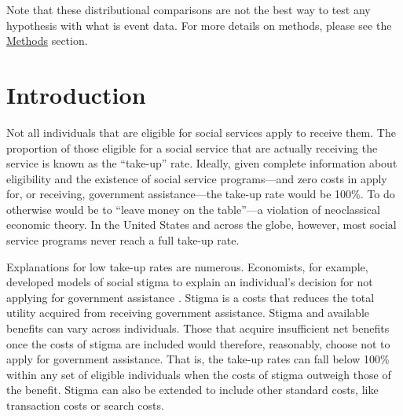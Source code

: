 \documentclass[12pt,letterpaperpaper,]{book}
\begin{document}
Note that these distributional comparisons are not the best way to test
any hypothesis with what is event data. For more details on methods,
please see the \protect\hyperlink{methods-2}{Methods} section.

\section*{Introduction}\label{introduction}

Not all individuals that are eligible for social services apply to
receive them. The proportion of those eligible for a social service that
are actually receiving the service is known as the ``take-up'' rate.
Ideally, given complete information about eligibility and the existence
of social service programs---and zero costs in apply for, or receiving,
government assistance---the take-up rate would be 100\%. To do otherwise
would be to ``leave money on the table''---a violation of neoclassical
economic theory. In the United States and across the globe, however,
most social service programs never reach a full take-up rate.

Explanations for low take-up rates are numerous. Economists, for
example, developed models of social stigma to explain an individual's
decision for not applying for government assistance
\citep{moffitt_economic_1983}. Stigma is a costs that reduces the total
utility acquired from receiving government assistance. Stigma and
available benefits can vary across individuals. Those that acquire
insufficient net benefits once the costs of stigma are included would
therefore, reasonably, choose not to apply for government assistance.
That is, the take-up rates can fall below 100\% within any set of
eligible individuals when the costs of stigma outweigh those of the
benefit. Stigma can also be extended to include other standard costs,
like transaction costs or search costs.
\end{document}
